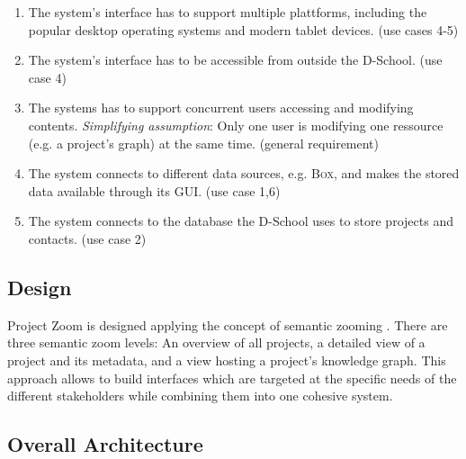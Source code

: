 \begin{enumerate}
\item The system's interface has to support multiple plattforms, including the popular desktop operating systems and modern tablet devices. (use cases 4-5)
\item The system's interface has to be accessible from outside the D-School. (use case 4) 
\item The systems has to support concurrent users accessing and modifying contents. \textit{Simplifying assumption}: Only one user is modifying one ressource (e.g. a project's graph) at the same time. (general requirement)
\item The system connects to different data sources, e.g. \textsc{Box}, and makes the stored data available through its GUI. (use case 1,6)
\item The system connects to the database the D-School uses to store projects and contacts. (use case 2)

\end{enumerate}

\subsection{Design}

Project Zoom is designed applying the concept of semantic zooming \cite{Perlin_1993}.  There are three semantic zoom levels: An overview of all projects, a detailed view of a project and its metadata, and a view hosting a project's knowledge graph. This approach allows to build interfaces which are targeted at the specific needs of the different stakeholders while combining them into one cohesive system.


\subsection{Overall Architecture}


